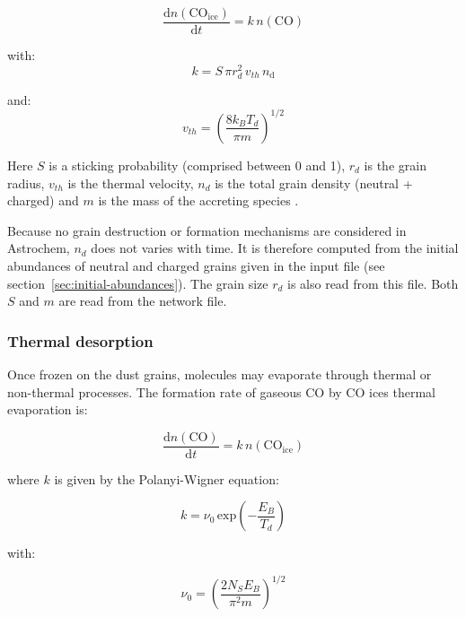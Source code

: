 \documentclass[a4paper,12pt]{article}
\newcommand{\conc}[1]{n(\mathrm{#1})}
\begin{document}
\begin{equation}
  \frac{\mathrm{d}\conc{CO_{ice}}}{\mathrm{d}t} = k \, \conc{CO}
\end{equation}

\noindent
with:
\begin{equation}
  k = S \, \pi r_{d}^2 \, v_{th} \, n_\mathrm{d}
  \label{eq:freeze-out}
\end{equation}

\noindent
and:
\begin{equation}
  v_{th} = \left( \frac{8 k_{B} T_{d}}{\pi m} \right)^{1/2}
  \label{eq:thermal-veloc}
\end{equation}

\noindent
Here $S$ is a sticking probability (comprised between 0 and 1),
$r_{d}$ is the grain radius, $v_{th}$ is the thermal velocity, $n_{d}$
is the total grain density (neutral + charged) and $m$ is the mass of
the accreting species \citep{Bergin95}.

Because no grain destruction or formation mechanisms are considered in
Astrochem, $n_{d}$ does not varies with time. It is therefore computed
from the initial abundances of neutral and charged grains given in the
input file (see section~\ref{sec:initial-abundances}). The grain size
$r_{d}$ is also read from this file. Both $S$ and $m$ are read from
the network file.

\subsubsection{Thermal desorption}
\label{sec:thermal-desorption}

Once frozen on the dust grains, molecules may evaporate through
thermal or non-thermal processes. The formation rate of gaseous CO by
CO ices thermal evaporation is:

\begin{equation}
  \frac{\mathrm{d}\conc{CO}}{\mathrm{d}t} = k \, \conc{CO_{ice}}
\end{equation}

\noindent
where $k$ is given by the Polanyi-Wigner equation:

\begin{equation}
  k = \nu_{0} \, \mathrm{exp} \left( - \frac{E_{B}}{T_{d}} \right)
  \label{eq:thermal-desorption}
\end{equation}

\noindent
with:

\begin{equation}
  \nu_{0} = \left( \frac{2 N_{S} E_{B}}{\pi^2 m} \right)^{1/2}
  \label{eq:vibration-freq}
\end{equation}
\end{document}
